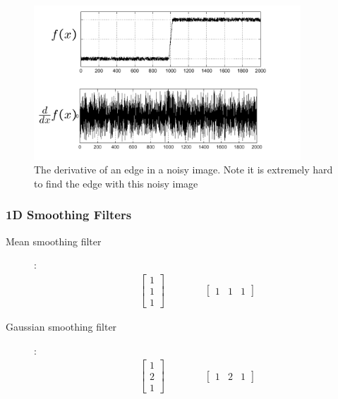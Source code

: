 \documentclass[letterpaper,12pt]{article}
\begin{document}
\begin{figure}[H]
 \centering
 \includegraphics[width=10cm]{images/noisy_derivative.png}
 \caption{The derivative of an edge in a noisy image. Note it is extremely hard to find the edge with this noisy image}
\end{figure}

\subsubsection{1D Smoothing Filters}
\begin{description}
 \item[Mean smoothing filter]:
       \begin{align}
        \begin{bmatrix}
         1 \\
         1 \\
         1
        \end{bmatrix}
        \quad\quad\quad\quad
        \begin{bmatrix}
         1 & 1 & 1
        \end{bmatrix}
       \end{align}
 \item[Gaussian smoothing filter]:
       \begin{align}
        \begin{bmatrix}
         1 \\
         2 \\
         1
        \end{bmatrix}
        \quad\quad\quad\quad
        \begin{bmatrix}
         1 & 2 & 1
        \end{bmatrix}
       \end{align}
\end{description}
\end{document}
